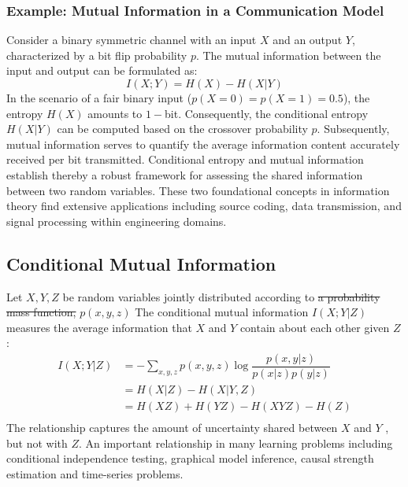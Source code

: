 \documentclass[12pt]{article}
\begin{document}
		
		\subsubsection*{Example: Mutual Information in a Communication Model}
		Consider a binary symmetric channel with an input \(X\) and an output \(Y\), characterized by a bit flip probability \(p\). The mutual information between the input and output can be formulated as:
		\[ I(X; Y) = H(X) - H(X|Y) \]
		In the scenario of a fair binary input (\(p(X=0) = p(X=1) = 0.5\)), the entropy \(H(X)\) amounts to \(1-\)bit. Consequently, the conditional entropy \(H(X|Y)\) can be computed based on the crossover probability \(p\). Subsequently, mutual information serves to quantify the average information content accurately received per bit transmitted. Conditional entropy and mutual information establish thereby a robust framework for assessing the shared information between two random variables. These two foundational concepts in information theory find extensive applications including source coding, data transmission, and signal processing within engineering domains.
		
		\subsection{Conditional Mutual Information}
		Let $X,Y,Z$ be random variables jointly distributed according to \st{a probability mass function,}  $p(x,y,z)$ The conditional mutual information $I(X; Y |Z)$ measures the average information that $X$ and $Y$ contain about each other given $Z$:
		\begin{equation}
			\begin{split}
				I(X; Y |Z) & = - \sum_{x,y,z}  p(x,y,z) \log \dfrac{p(x,y|z)}{p(x|z)p(y|z)} \\
				& = H(X|Z) - H(X|Y,Z) \\
				& = H(X Z) + H(Y Z) - H(X Y Z) - H(Z) \\
			\end{split}
		\end{equation}
		The relationship captures the amount of uncertainty shared between $X$ and $Y$ , but not with $Z$. An important relationship in many learning problems including conditional independence testing, graphical model inference, causal strength estimation and time-series problems. 
		
		
\end{document}
